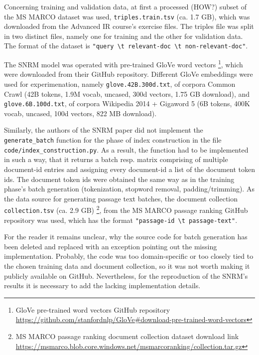 Concerning training and validation data, at first a processed (HOW?) subset of the MS MARCO dataset was used, 
    \verb|triples.train.tsv| (ca. 1.7 GB), which was downloaded from the Advanced IR course's exercise files.
The triples file was split in two distinct files, namely one for training and the other for validation data.
The format of the dataset is \verb|"query \t relevant-doc \t non-relevant-doc"|.

The SNRM model was operated with pre-trained GloVe word vectors
    \footnote{GloVe pre-trained word vectors GitHub repository \url{https://github.com/stanfordnlp/GloVe\#download-pre-trained-word-vectors}},
    which were downloaded from their GitHub repository.
Different GloVe embeddings were used for experimenation, namely \verb|glove.42B.300d.txt|, 
    of corpora Common Crawl (42B tokens, 1.9M vocab, uncased, 300d vectors, 1.75 GB download), 
    and \verb|glove.6B.100d.txt|, of corpora Wikipedia 2014 + Gigaword 5 (6B tokens, 400K vocab, uncased, 100d vectors, 822 MB download).


Similarly, the authors of the SNRM paper did not implement the \verb|generate_batch| function for the phase of index construction in 
    the file \verb|code/index_construction.py|. As a result, the function had to be implemented in such a way, that it returns a
    batch resp. matrix comprising of multiple document-id entries and assigning every document-id a list of the document token ids.
    The document token ids were obtained the same way as in the training phase's batch generation 
    (tokenization, stopword removal, padding/trimming).
As the data source for generating passage text batches, the document collection \verb|collection.tsv| (ca. 2.9 GB)
    \footnote{MS MARCO passage ranking document collection dataset download link 
    \url{https://msmarco.blob.core.windows.net/msmarcoranking/collection.tar.gz}}, 
    from the MS MARCO passage ranking GitHub repository was used, which has the format \verb|"passage-id \t passage-text"|.

For the reader it remains unclear, why the source code for batch generation has been deleted and replaced with an exception pointing out the
    missing implementation. 
Probably, the code was too domain-specific or too closely tied to the chosen training data and document collection,
    so it was not worth making it publicly available on GitHub.
Nevertheless, for the reproduction of the SNRM's results it is necessary to add the lacking implementation details.

